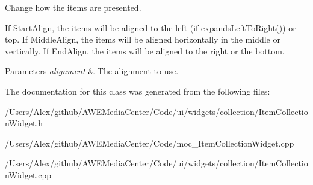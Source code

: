 Change how the items are presented. 

If {\ttfamily Start\-Align}, the items will be aligned to the left (if {\ttfamily \hyperlink{class_u_i_1_1_item_collection_widget_ab7a43c61219c5d8f1c048ab07abcb21b}{expands\-Left\-To\-Right()}}) or top. If {\ttfamily Middle\-Align}, the items will be aligned horizontally in the middle or vertically. If {\ttfamily End\-Align}, the items will be aligned to the right or the bottom.


\begin{DoxyParams}{Parameters}
{\em alignment} & The alignment to use. \\
\hline
\end{DoxyParams}


The documentation for this class was generated from the following files\-:\begin{DoxyCompactItemize}
\item 
/\-Users/\-Alex/github/\-A\-W\-E\-Media\-Center/\-Code/ui/widgets/collection/Item\-Collection\-Widget.\-h\item 
/\-Users/\-Alex/github/\-A\-W\-E\-Media\-Center/\-Code/moc\-\_\-\-Item\-Collection\-Widget.\-cpp\item 
/\-Users/\-Alex/github/\-A\-W\-E\-Media\-Center/\-Code/ui/widgets/collection/Item\-Collection\-Widget.\-cpp\end{DoxyCompactItemize}
